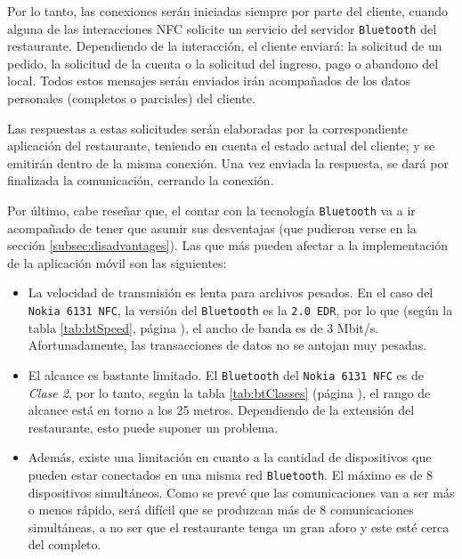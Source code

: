 Por lo tanto, las conexiones serán iniciadas siempre por parte del cliente, 
cuando alguna de las interacciones \acs{NFC} solicite un servicio del
servidor \texttt{Bluetooth} del restaurante. Dependiendo de la interacción, el 
cliente enviará: la solicitud de un pedido, la solicitud de la cuenta o la 
solicitud del ingreso, pago o abandono del local. Todos estos mensajes serán 
enviados irán acompañados de los datos personales (completos o parciales) del 
cliente.

Las respuestas a estas solicitudes serán elaboradas por la correspondiente 
aplicación del restaurante, teniendo en cuenta el estado actual del cliente; y 
se emitirán dentro de la misma conexión. Una vez enviada la respuesta, se
dará por finalizada la comunicación, cerrando la conexión.

Por último, cabe reseñar que, el contar con la tecnología \texttt{Bluetooth} va
a ir acompañado de tener que asumir sus desventajas (que pudieron verse en 
la sección \ref{subsec:disadvantages}). Las que más pueden afectar a la
implementación de la aplicación móvil son las siguientes:
\begin{itemize}
\item La velocidad de transmisión es lenta para archivos pesados. En el
caso del \texttt{Nokia 6131 \acs{NFC}}, la versión del \texttt{Bluetooth} es
la \texttt{2.0 EDR}, por lo que (según la tabla \ref{tab:btSpeed}, página
\pageref{tab:btSpeed}), el ancho de banda es de 3 Mbit/s. Afortunadamente, las
transacciones de datos no se antojan muy pesadas.
\item El alcance es bastante limitado. El \texttt{Bluetooth} del
\texttt{Nokia 6131 \acs{NFC}} es de \emph{Clase 2}, por lo tanto, según
la tabla \ref{tab:btClasses} (página \pageref{tab:btClasses}), el rango
de alcance está en torno a los 25 metros. Dependiendo de la extensión del
restaurante, esto puede suponer un problema.
\item Además, existe una limitación en cuanto a la cantidad de dispositivos 
que pueden estar conectados en una misma red \texttt{Bluetooth}. El máximo es de 
8 dispositivos simultáneos. Como se prevé que las comunicaciones van a ser
más o menos rápido, será difícil que se produzcan más de 8 comunicaciones
simultáneas, a no ser que el restaurante tenga un gran aforo y este esté cerca
del completo.
\end{itemize}

